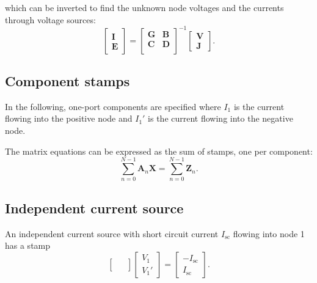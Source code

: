 \documentclass[a4paper, 12pt]{article}
\newcommand{\mat}[1]{\mathbf{#1}}
\renewcommand{\vec}[1]{\mathbf{#1}}
\newcommand{\Isc}{I_{\mathrm{sc}}}
\begin{document}
%
which can be inverted to find the unknown node voltages and the
currents through voltage sources:
%
\begin{equation}
  \begin{bmatrix}
    \vec{I} \\ \vec{E}
  \end{bmatrix}
=
  \begin{bmatrix}
    \mat{G} & \mat{B} \\
    \mat{C} & \mat{D} \\
  \end{bmatrix}^{-1}
  \begin{bmatrix}
    \vec{V} \\ \vec{J}
  \end{bmatrix}.
\end{equation}


\subsection{Component stamps}

In the following, one-port components are specified where $I_1$ is the
current flowing into the positive node and $I_1'$ is the current
flowing into the negative node.

The matrix equations can be expressed as the sum of stamps, one per
component:
%
\begin{equation}
 \sum_{n=0}^{N-1} \mat{A}_n \mat{X} = \sum_{n=0}^{N-1} \mat{Z}_n.
\end{equation}


\subsection{Independent current source}

An independent current source with short circuit current
$\Isc$ flowing into node 1 has a stamp
%
\begin{equation}
  \begin{bmatrix}
    & \\
    & \\
  \end{bmatrix}
  \begin{bmatrix}
    V_1 \\ V_1'
  \end{bmatrix}
  =
  \begin{bmatrix}
    -\Isc \\ \Isc
  \end{bmatrix}.
\end{equation}
\end{document}
